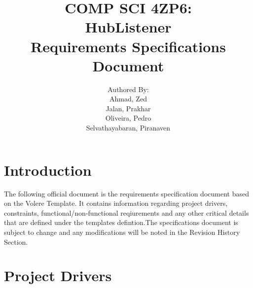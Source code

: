 \documentclass{article}
\title{COMP SCI 4ZP6:\\ \textbf{HubListener}\\ Requirements Specifications Document}
\author{ Authored By:
		\\ Ahmad, Zed
		\\ Jalan, Prakhar 
		\\ Oliveira, Pedro
		\\ Selvathayabaran, Piranaven
}
\date{}
\begin{document}
\newpage

\maketitle

\newpage
\tableofcontents {}
\newpage

\section{Introduction}

The following official document is the requirements specification document based on the Volere Template. It contains information regarding project drivers, constraints, functional/non-functional reqiurements and  any other critical details that are defined under the templates defintion.The specifications document is subject to change and any modifications will be noted in the Revision History Section. 
\newpage
\section{Project Drivers}
\end{document}
